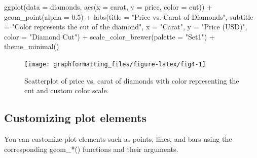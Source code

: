 \documentclass[
]{book}
\newenvironment{Shaded}{\begin{snugshade}}{\end{snugshade}}
\newcommand{\AttributeTok}[1]{\textcolor[rgb]{0.77,0.63,0.00}{#1}}
\newcommand{\FloatTok}[1]{\textcolor[rgb]{0.00,0.00,0.81}{#1}}
\newcommand{\FunctionTok}[1]{\textcolor[rgb]{0.00,0.00,0.00}{#1}}
\newcommand{\NormalTok}[1]{#1}
\newcommand{\SpecialCharTok}[1]{\textcolor[rgb]{0.00,0.00,0.00}{#1}}
\newcommand{\StringTok}[1]{\textcolor[rgb]{0.31,0.60,0.02}{#1}}
\begin{document}
\begin{Shaded}
\begin{Highlighting}[]
\FunctionTok{ggplot}\NormalTok{(}\AttributeTok{data =}\NormalTok{ diamonds, }\FunctionTok{aes}\NormalTok{(}\AttributeTok{x =}\NormalTok{ carat, }\AttributeTok{y =}\NormalTok{ price, }\AttributeTok{color =}\NormalTok{ cut)) }\SpecialCharTok{+}
  \FunctionTok{geom\_point}\NormalTok{(}\AttributeTok{alpha =} \FloatTok{0.5}\NormalTok{) }\SpecialCharTok{+}
  \FunctionTok{labs}\NormalTok{(}\AttributeTok{title =} \StringTok{"Price vs. Carat of Diamonds"}\NormalTok{,}
       \AttributeTok{subtitle =} \StringTok{"Color represents the cut of the diamond"}\NormalTok{,}
       \AttributeTok{x =} \StringTok{"Carat"}\NormalTok{,}
       \AttributeTok{y =} \StringTok{"Price (USD)"}\NormalTok{,}
       \AttributeTok{color =} \StringTok{"Diamond Cut"}\NormalTok{) }\SpecialCharTok{+}
  \FunctionTok{scale\_color\_brewer}\NormalTok{(}\AttributeTok{palette =} \StringTok{"Set1"}\NormalTok{) }\SpecialCharTok{+}
  \FunctionTok{theme\_minimal}\NormalTok{()}
\end{Highlighting}
\end{Shaded}

\begin{figure}
\texttt{[image: graphformatting\_files/figure-latex/fig4-1]} \caption{Scatterplot of price vs. carat of diamonds with color representing the cut and custom color scale.}\label{fig:fig4}
\end{figure}

\hypertarget{customizing-plot-elements}{%
\subsection{Customizing plot elements}\label{customizing-plot-elements}}

You can customize plot elements such as points, lines, and bars using the corresponding geom\_*() functions and their arguments.
\end{document}
